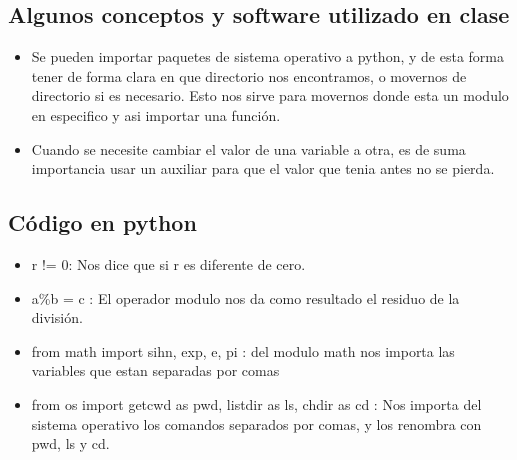 \documentclass{book}
\begin{document}
	\subsection { Algunos conceptos y software utilizado en clase}%
	\begin{itemize}
		\item Se pueden importar paquetes de sistema operativo a python, y de esta forma tener de forma clara en que directorio nos encontramos, o movernos de directorio si es necesario. Esto nos sirve para movernos donde esta un modulo en especifico y asi importar una función.
		\item Cuando se necesite cambiar el valor de una variable a otra, es de suma importancia usar un auxiliar para que el valor que tenia antes no se pierda.	
		
	\end{itemize}
	
	\subsection {Código en python}%
	\begin{itemize}%
		\item r != 0: Nos dice que si r es diferente de cero.
		\item a\%b = c : El operador modulo nos da como resultado el residuo de la división.
		\item from math import sihn, exp, e, pi : del modulo math nos importa las variables que estan separadas por comas
		\item from os import getcwd as pwd, listdir as ls, chdir as cd : Nos importa del sistema operativo los comandos separados por comas, y los renombra con pwd, ls y cd.
		
		
		
		
	\end{itemize}%
\end{document}

